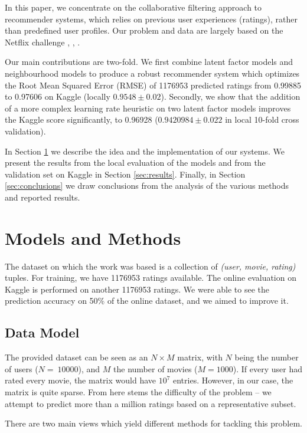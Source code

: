 \documentclass[10pt,conference,compsocconf]{IEEEtran}
\begin{document}
	In this paper, we concentrate on the collaborative filtering approach to recommender systems, which relies on previous user experiences (ratings), rather than predefined user profiles. Our problem and data are largely based on the Netflix challenge \cite{SMH07}, \cite{Koren09matrixfactorization}, \cite{funk2011netflix}.
	
	Our main contributions are two-fold. We first combine latent factor models and neighbourhood models to produce a robust recommender system which optimizes the Root Mean Squared Error (RMSE) of 1176953 predicted ratings from  0.99885 to 0.97606 on Kaggle (locally $0.9548\pm0.02$). Secondly, we show that the addition of a more complex learning rate heuristic on two latent factor models improves the Kaggle score significantly, to 0.96928 ($0.9420984\pm{0.022}$ in local 10-fold cross validation).
	
	In Section \ref{sec:models} we describe the idea and the implementation of our systems. We present the results from the local evaluation of the models and from the validation set on Kaggle in Section \ref{sec:results}. Finally, in Section \ref{sec:conclusions} we draw conclusions from the analysis of the various methods and reported results.
	
	
	\section{Models and Methods}
	\label{sec:models}
	The dataset on which the work was based is a collection of \emph{(user, movie, rating)} tuples. For training, we have 1176953 ratings available. The online evaluation on Kaggle is performed on another 1176953 ratings. We were able to see the prediction accuracy on 50\% of the online dataset, and we aimed to improve it.
	\subsection{Data Model}
	
	The provided dataset can be seen as an $N\times M$ matrix, with $N$ being the number of users ($N=~10000$), and $M$ the number of movies ($M=1000$). If every user had rated every movie, the matrix would have $10^7$ entries. However, in our case, the matrix is quite sparse. From here stems the difficulty of the problem -- we attempt to predict more than a million ratings based on a representative subset. 
	
	There are two main views which yield different methods for tackling this problem.
	
\end{document}
